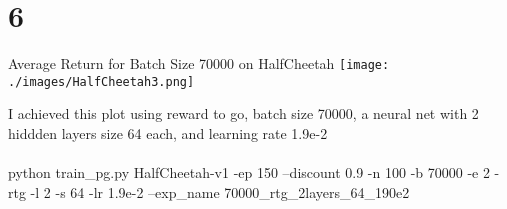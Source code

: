 \documentclass[12pt]{report}
\begin{document}
\section*{6}
\begin{center}
Average Return for Batch Size 70000 on HalfCheetah
\texttt{[image: ./images/HalfCheetah3.png]}
\end{center}
I achieved this plot using reward to go, batch size 70000, a neural net with 2 hiddden layers size 64 each, and learning rate 1.9e-2\\
\\
python train\_pg.py HalfCheetah-v1 -ep 150 --discount 0.9 -n 100 -b 70000 -e 2 -rtg -l 2 -s 64 -lr 1.9e-2 --exp\_name 70000\_rtg\_2layers\_64\_190e2
\end{document}
